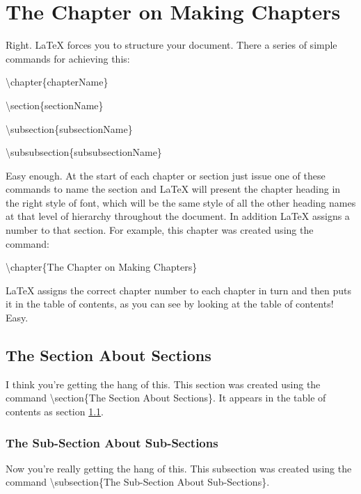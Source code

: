 \chapter{The Chapter on Making Chapters}
\label{sec:Chapters}

Right. LaTeX forces you to structure your document. There a series of simple commands for achieving this:

\vspace*{2ex}

{\textbackslash}chapter\{chapterName\}

{\textbackslash}section\{sectionName\}

{\textbackslash}subsection\{subsectionName\}

{\textbackslash}subsubsection\{subsubsectionName\}

\vspace*{2ex}

Easy enough. At the start of each chapter or section just issue one of these commands to name the section and LaTeX will present the chapter heading in the right style of font, which will be the same style of all the other heading names at that level of hierarchy throughout the document. In addition LaTeX assigns a number to that section. For example, this chapter was created using the command:

\vspace*{2ex}

{\textbackslash}chapter\{The Chapter on Making Chapters\} 

\vspace*{2ex}

LaTeX assigns the correct chapter number to each chapter in turn and then puts it in the table of contents, as you can see by looking at the table of contents! Easy.

\pagebreak
\section{The Section About Sections}
\label{sec:Section}
I think you're getting the hang of this. This section was created using the command {\textbackslash}section\{The Section About Sections\}. It appears in the table of contents as section \ref{sec:Section}.

\subsection{The Sub-Section About Sub-Sections}
\label{sec:SubSection}
Now you're really getting the hang of this. This subsection was created using the command {\textbackslash}subsection\{The Sub-Section About Sub-Sections\}. 


